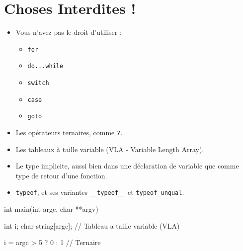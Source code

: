 \documentclass{42-fr}
\begin{document}
    \section{Choses Interdites !}

        \begin{itemize}

            \item Vous n’avez pas le droit d’utiliser  :

                \begin{itemize}

                    \item \texttt{for}
                    \item \texttt{do...while}
                    \item \texttt{switch}
                    \item \texttt{case}
                    \item \texttt{goto}

                \end{itemize}

            \item Les opérateurs ternaires, comme \texttt{?}.

            \item Les tableaux à taille variable (VLA - Variable Length Array).

            \item Le type implicite, aussi bien dans une déclaration de variable que
              comme type de retour d’une fonction.

            \item \texttt{typeof}, et ses variantes \texttt{\_\_typeof\_\_} et
              \texttt{typeof\_unqual}.

        \end{itemize}
        \begin{42ccode}
    int main(int argc, char **argv)
    {
        int     i;
        char    string[argc]; // Tableau a taille variable (VLA)

        i = argc > 5 ? 0 : 1 // Ternaire
    }
        \end{42ccode}
        \newpage

\end{document}
